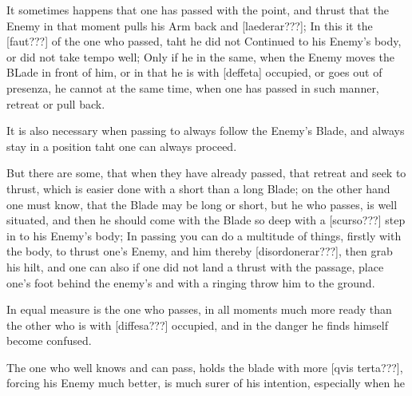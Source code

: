 It sometimes happens that one has passed with the point, and thrust
that the Enemy in that moment pulls his Arm back and [laederar???]; In
this it the [faut???] of the one who passed, taht he did not Continued
to his Enemy's body, or did not take tempo well; Only if he in the
same, when the Enemy moves the BLade in front of him, or in that he is
with [deffeta] occupied, or goes out of presenza, he cannot at the
same time, when one has passed in such manner, retreat or pull back.


It is also necessary when passing to always follow the Enemy's Blade,
and always stay in a position taht one can always proceed.


But there are some, that when they have already passed, that retreat
and seek to thrust, which is easier done with a
short than a long Blade; on the other hand one must know, that the
Blade may be long or short, but he who passes, is well situated, and
then he should come with the Blade so deep with a [scurso???] step in
to his Enemy's body; In passing you can do a multitude of things,
firstly with the body, to thrust one's Enemy, and him thereby
[disordonerar???], then grab his hilt, and one can also if one did not
land a thrust with the passage, place one's foot behind the enemy's
and with a ringing throw him to the ground.


In equal measure is the one who passes, in all moments much more ready
than the other who is with [diffesa???] occupied, and in the danger he
finds himself become confused.


The one who well knows and can pass, holds the blade with more [qvis
terta???], forcing his Enemy much better, is much surer of his
intention, especially when he
